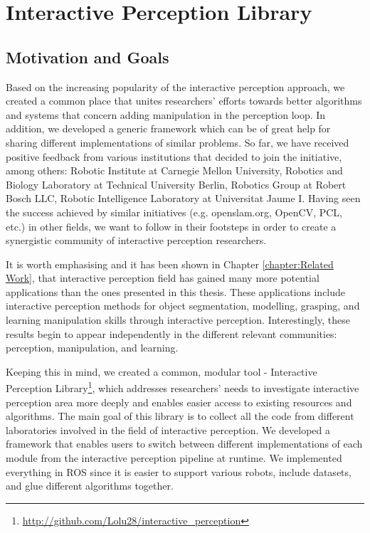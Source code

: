 \chapter{Interactive Perception Library}
\label{chapter:Interactive Perception Library}


\section{Motivation and Goals}

Based on the increasing popularity of the interactive perception approach, we created a common place that unites researchers' efforts towards better algorithms and systems that concern adding manipulation in the perception loop. In addition, we developed a generic framework which can be of great help for sharing different implementations of similar problems. So far, we have received positive feedback from various institutions that decided to join the initiative, among others: Robotic Institute at Carnegie Mellon University, Robotics and Biology Laboratory at Technical University Berlin, Robotics Group at Robert Bosch LLC, Robotic Intelligence Laboratory at Universitat Jaume I. Having seen the success achieved by similar initiatives (e.g. openslam.org, OpenCV, PCL, etc.) in other fields, we want to follow in their footsteps in order to create a synergistic community of interactive perception researchers.

It is worth emphasising and it has been shown in Chapter \ref{chapter:Related Work}, that interactive perception field has gained many more potential applications than the ones presented in this thesis. These applications include interactive perception methods for object segmentation, modelling, grasping, and learning manipulation skills through interactive perception. Interestingly, these results begin to appear independently in the different relevant communities: perception, manipulation, and learning.

Keeping this in mind, we created a common, modular tool - Interactive Perception Library\footnote{\url{http://github.com/Lolu28/interactive_perception}}, which addresses researchers' needs to investigate interactive perception area more deeply and enables easier access to existing resources and algorithms. The main goal of this library is to collect all the code from different laboratories involved in the field of interactive perception. We developed a framework that enables users to switch between different implementations of each module from the interactive perception pipeline at runtime. We implemented everything in ROS since it is easier to support various robots, include datasets, and glue different algorithms together. 


